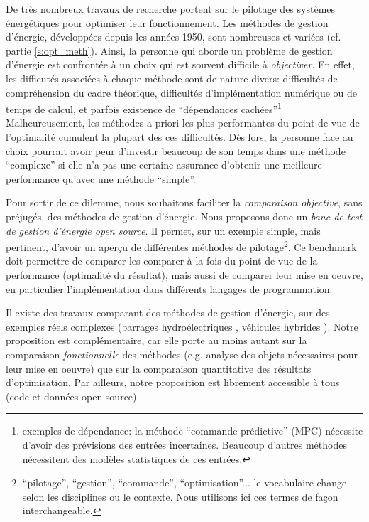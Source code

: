 \documentclass[a4paper,10pt,twocolumn]{article}
\begin{document}
De très nombreux travaux de recherche portent sur le pilotage des systèmes énergétiques
pour optimiser leur fonctionnement.
Les méthodes de gestion d'énergie, développées depuis les années 1950,
sont nombreuses et variées (cf. partie \ref{s:opt_meth}).
Ainsi, la personne qui aborde un problème de gestion d'énergie
est confrontée à un choix qui est souvent difficile à \emph{objectiver}.
En effet, les difficutés associées à chaque méthode sont de nature divers:
difficultés de compréhension du cadre théorique, difficultés d'implémentation
numérique ou de temps de calcul, et parfois existence de
``dépendances cachées''\footnote{exemples de dépendance:
la méthode ``commande prédictive'' (MPC) nécessite d'avoir des prévisions des entrées incertaines.
Beaucoup d'autres méthodes nécessitent des modèles statistiques de ces entrées.}
Malheureusement, les méthodes a priori les plus performantes du point de vue de l'optimalité
cumulent la plupart des ces difficultés.
Dès lors, la personne face au choix pourrait avoir peur d'investir beaucoup de son temps
dans une méthode ``complexe'' si elle n'a pas une certaine assurance d'obtenir une meilleure
performance qu'avec une méthode ``simple''.

Pour sortir de ce dilemme, nous souhaitons faciliter la \emph{comparaison objective},
sans préjugés, des méthodes de gestion d'énergie.
Nous proposons donc un \emph{banc de test de gestion d'énergie open source}.
Il permet, sur un exemple simple, mais pertinent, d'avoir un aperçu de différentes méthodes
de pilotage\footnote{``pilotage'', ``gestion'', ``commande'', ``optimisation''...
le vocabulaire change selon les disciplines ou le contexte.
Nous utilisons ici ces termes de façon interchangeable.}.
Ce benchmark doit permettre de comparer les comparer
à la fois du point de vue de la performance (optimalité du résultat),
mais aussi de comparer leur mise en oeuvre, en particulier l'implémentation
dans différents langages de programmation.

Il existe des travaux comparant des méthodes de gestion d'énergie, sur des exemples réels complexes
(barrages hydroélectriques \cite{Zambelli:2011:SBA}, véhicules hybrides \cite{Jiang:2017:ToVT}).
Notre proposition est complémentaire, car elle porte au moins autant sur la comparaison \emph{fonctionnelle}
des méthodes (e.g. analyse des objets nécessaires pour leur mise en oeuvre) que
sur la comparaison quantitative des résultats d'optimisation.
Par ailleurs, notre proposition est librement accessible à tous (code et données open source).
\end{document}
